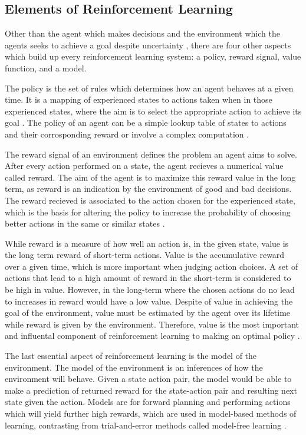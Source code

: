 \subsection{Elements of Reinforcement Learning}

Other than the agent which makes decisions and the environment which the agents seeks to achieve a goal despite uncertainty \cite{Sutton1}, there are four other aspects which build up every reinforcement learning system: a policy, reward signal, value function, and a model.

The policy is the set of rules which determines how an agent behaves at a given time. It is a mapping of experienced states to actions taken when in those experienced states, where the aim is to select the appropriate action to achieve its goal \cite{GabrieleDe}. The policy of an agent can be a simple lookup table of states to actions and their corrosponding reward or involve a complex computation \cite{Sutton1}. 

The reward signal of an environment defines the problem an agent aims to solve. After every action performed on a state, the agent recieves a numerical value called reward. The aim of the agent is to maximize this reward value in the long term, as reward is an indication by the environment of good and bad decisions. The reward recieved is associated to the action chosen for the experienced state, which is the basis for altering the policy to increase the probability of choosing better actions in the same or similar states \cite{Sutton1}. 

While reward is a measure of how well an action is, in the given state, value is the long term reward of short-term actions. Value is the accumulative reward over a given time, which is more important when judging action choices. A set of actions that lead to a high amount of reward in the short-term is considered to be high in value. However, in the long-term where the chosen actions do no lead to increases in reward would have a low value. Despite of value in achieving the goal of the environment, value must be estimated by the agent over its lifetime while reward is given by the environment. Therefore, value is the most important and influental component of reinforcement learning to making an optimal policy \cite{Sutton1}. 

The last essential aspect of reinforcement learning is the model of the environment. The model of the environment is an inferences of how the environment will behave. Given a state action pair, the model would be able to make a prediction of returned reward for the state-action pair and resulting next state given the action. Models are for forward planning and performing actions which will yield further high rewards, which are used in model-based methods of learning, contrasting from trial-and-error methods called model-free learning \cite{Sutton1}.

